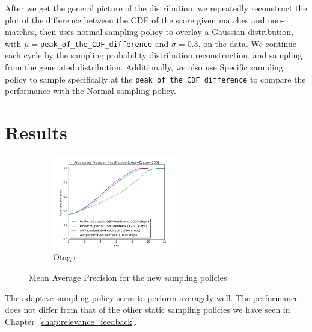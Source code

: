 After we get the general picture of the distribution, we repeatedly reconstruct
the plot of the difference between the CDF of the score given matches and
non-matches, then uses normal sampling policy to overlay a Gaussian
distribution, with $\mu=$\texttt{peak\_of\_the\_CDF\_difference} and
$\sigma=0.3$, on the data. We continue each cycle by the sampling probability
distribution reconstruction, and sampling from the generated distribution.
Additionally, we also use Specific sampling policy to sample specifically at the
\texttt{peak\_of\_the\_CDF\_difference} to compare the performance with the
Normal sampling policy.

\section{Results}

\begin{figure}[htb]
  \centering
  \begin{subfigure}[t]{\textwidth}
    \centering
    \includegraphics[width=0.6\textwidth]{otago}
    \caption{Otago}
  \end{subfigure}
  \caption{Mean Average Precision for the new sampling policies}
  \label{fig:adaptive_aoc} %
\end{figure}

The adaptive sampling policy seem to perform averagely well. The performance
does not differ from that of the other static sampling policies we have seen in
Chapter~\ref{chap:relevance_feedback}.

